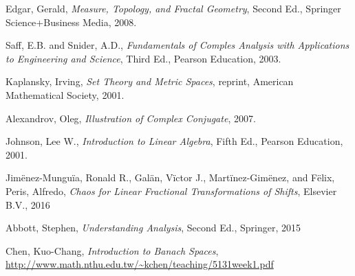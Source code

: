 \documentclass[11pt]{article}
\theoremstyle{plain}
\theoremstyle{definition}
\begin{document}
\newpage  
\begin{thebibliography}{99}
\singlespacing
{} Edgar, Gerald, \emph{Measure, Topology, and Fractal Geometry}, Second Ed., Springer Science+Business Media, 2008.

 Saff, E.B. and Snider, A.D., \emph{Fundamentals of Comples Analysis with Applications to Engineering and Science}, Third Ed., Pearson Education, 2003.

 Kaplansky, Irving, \emph{Set Theory and Metric Spaces}, reprint, American Mathematical Society, 2001.

 Alexandrov, Oleg, \emph{Illustration of Complex Conjugate}, 2007.

 Johnson, Lee W., \emph{Introduction to Linear Algebra}, Fifth Ed., Pearson Education, 2001.

 Jim{\"e}nez-Mungu{\"i}a, Ronald R., Gal{\"a}n, V{\"i}ctor J., Mart{\"i}nez-Gim{\"e}nez, and F{\"e}lix, Peris, Alfredo, \emph{Chaos for Linear Fractional Transformations of Shifts}, Elsevier B.V., 2016

 Abbott, Stephen, \emph{Understanding Analysis}, Second Ed., Springer, 2015

 Chen, Kuo-Chang, \emph{Introduction to Banach Spaces}, \url{http://www.math.nthu.edu.tw/~kchen/teaching/5131week1.pdf}

\end{thebibliography}

\end{document}
